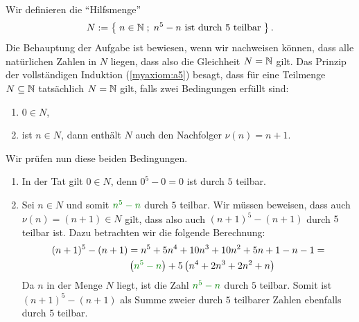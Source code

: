 \begin{myanswer}[myexercise:0299]
	Wir definieren die \enquote{Hilfsmenge}
	\begin{align*}
		N:=\left\{\;n\in\mathbb{N} \; ; \; \text{$n^5-n$ ist durch $5$ teilbar} \;\right\}.
	\end{align*}
	Die Behauptung der Aufgabe ist bewiesen, wenn wir nachweisen können, dass alle natürlichen Zahlen in $N$ liegen, dass also die Gleichheit $N=\mathbb{N}$ gilt. Das Prinzip der vollständigen Induktion (\cref{myaxiom:a5}) besagt, dass für eine Teilmenge $N\subseteq\mathbb{N}$ tatsächlich $N=\mathbb{N}$ gilt, falls zwei Bedingungen erfüllt sind:
	\begin{enumerate}
		\item $0\in N$,
		\item ist $n\in N$, dann enthält $N$ auch den Nachfolger $\nu(n) = n+1$.
	\end{enumerate}
	Wir prüfen nun diese beiden Bedingungen.
	\begin{enumerate}
		\item In der Tat gilt $0\in N$, denn $0^5-0 = 0$ ist durch $5$ teilbar. \checkmark
		\item Sei $n\in N$ und somit $\textcolor{Green}{n^5-n}$ durch $5$ teilbar. Wir müssen beweisen, dass auch $\nu(n)=(n+1)\in N$ gilt, dass also auch $(n+1)^5-(n+1)$ durch $5$ teilbar ist. Dazu betrachten wir die folgende Berechnung:
		      \begin{align*}
			      (n+1)^5-(n+1) & = n^5+5n^4+10n^3+10n^2+5n+1-n-1 =                     \\
			                    & \lr{\textcolor{Green}{n^5-n}} + 5\lr{n^4+2n^3+2n^2+n}
		      \end{align*}
		      Da $n$ in der Menge $N$ liegt, ist die Zahl $\textcolor{Green}{n^5-n}$ durch $5$ teilbar. Somit ist $(n+1)^5-(n+1)$ als Summe zweier durch $5$ teilbarer Zahlen ebenfalls durch $5$ teilbar. \checkmark
	\end{enumerate}
\end{myanswer}

